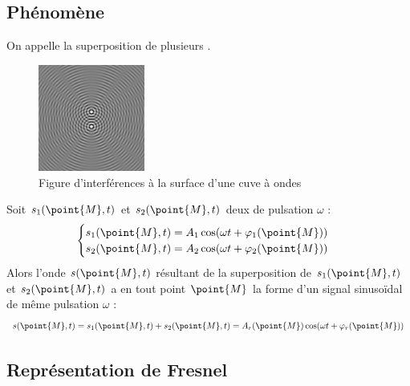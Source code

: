 \subsection{Phénomène}

\begin{definition}
On appelle  la superposition de plusieurs .

\begin{figure}[H]
\begin{center}
\includegraphics[width=3.5cm]{01_signaux_harmoniques_propagation/interferences.png}

\captionsetup{labelformat=empty}
\caption{Figure d'interférences à la surface d'une cuve à ondes}
\end{center}
\end{figure}
\end{definition}

\begin{propriete}
Soit $s_1(\point{M}, t)$ et $s_2(\point{M}, t)$ deux  de pulsation $\omega$ :
\[\begin{cases}
s_1(\point{M}, t) = A_1 \cos(\omega t + \varphi_1(\point{M}))\\
s_2(\point{M}, t) = A_2 \cos(\omega t + \varphi_2(\point{M}))
\end{cases}\]
Alors l'onde  $s(\point{M}, t)$ résultant de la superposition de $s_1(\point{M}, t)$ et $s_2(\point{M}, t)$ a en tout point $\point{M}$ la forme d'un signal sinusoïdal de même pulsation $\omega$ :
\[s(\point{M}, t) = s_1(\point{M}, t) + s_2(\point{M}, t) = A_r(\point{M}) \cos(\omega t + \varphi_r(\point{M}))\]
\end{propriete}



\subsection{Représentation de Fresnel}

